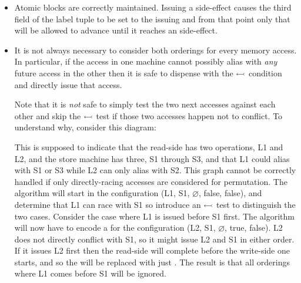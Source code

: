 \begin{itemize}
\item
  Atomic blocks are correctly maintained.  Issuing a
   side-effect causes the third field of the label
  tuple to be set to the issuing {\StateMachine} and from that point
  only that {\StateMachine} will be allowed to advance until it
  reaches an  side-effect.  

\item
  It is not always necessary to consider both orderings for every
  memory access.  In particular, if the access in one machine cannot
  possibly alias with \emph{any} future access in the other then it is
  safe to dispense with the $\leftarrowtail$ condition and directly
  issue that access.


  Note that it is \emph{not} safe to simply test the two next accesses
  against each other and skip the $\leftarrowtail$ test if those two
  accesses happen not to conflict.  To understand why, consider this
  diagram:


  This is supposed to indicate that the read-side {\StateMachine} has
  two operations, L1 and L2, and the store machine has three, S1
  through S3, and that L1 could alias with S1 or S3 while L2 can only
  alias with S2.  This graph cannot be correctly handled if only
  directly-racing accesses are considered for permutation.  The
  algorithm will start in the configuration (L1, S1, $\varnothing$,
  false, false), and determine that L1 can race with S1 so introduce
  an $\leftarrowtail$ test to distinguish the two cases.  Consider the
  case where L1 is issued before S1 first.  The algorithm will now
  have to encode a {\StateMachine} for the configuration (L2, S1,
  $\varnothing$, true, false).  L2 does not directly conflict with S1,
  so it might issue L2 and S1 in either order.  If it issues L2 first
  then the read-side {\StateMachine} will complete before the
  write-side one starts, and so the {\StateMachine} will be replaced
  with just .  The result is that all orderings where
  L1 comes before S1 will be ignored.


\end{itemize}
